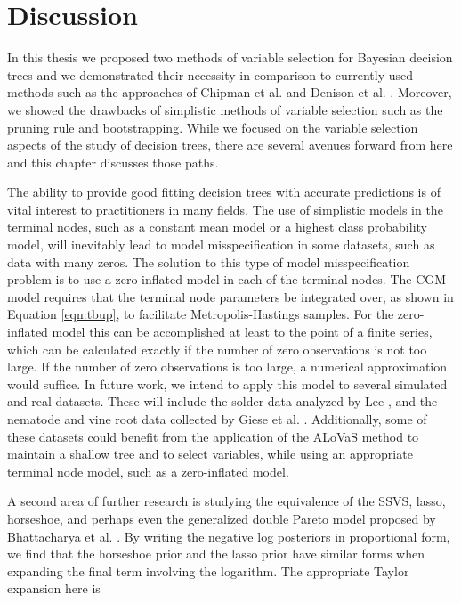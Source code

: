 \chapter{Discussion}
\label{ch:discuss}
 
In this thesis we proposed two methods of variable selection for Bayesian decision trees and we demonstrated their necessity in comparison to currently used methods such as  the approaches of Chipman et al. \cite{chipman1998bayesian} and Denison et al. \cite{denison1998bayesian}. Moreover, we showed the drawbacks of simplistic methods of variable selection such as the pruning rule and bootstrapping. While we focused on the variable selection aspects of the study of decision trees, there are several avenues forward from here and this chapter discusses those paths. 

The ability to provide good fitting decision trees with accurate predictions is of vital interest to practitioners in many fields. The use of simplistic models in the terminal nodes, such as a constant mean model or a highest class probability model, will inevitably lead to model misspecification in some datasets, such as data with many zeros. The solution to this type of model misspecification problem is to use a zero-inflated model in each of the terminal nodes. The CGM model requires  that the terminal node parameters be integrated over, as shown in Equation \ref{eqn:tbup}, to facilitate Metropolis-Hastings samples. For the zero-inflated model this can be accomplished at least to the point of a finite series, which can be calculated exactly if the number of zero observations is not too large. If the number of zero observations is too large, a numerical approximation would suffice. In future work, we intend to apply this model to several simulated and real datasets. These will include the solder data analyzed by Lee \cite{lee2006decision}, and the nematode and vine root data collected by Giese et al. \cite{giese2014,giese2014complete}. Additionally, some of these datasets could benefit from the application of the ALoVaS method to maintain a shallow tree and to select variables, while using an appropriate terminal node model, such as a zero-inflated model.  

A second area of further research is studying the equivalence of the SSVS, lasso, horseshoe, and perhaps even the generalized double Pareto model proposed by Bhattacharya et al. \cite{bhattacharya2012bayesian}. By writing the negative log posteriors in proportional form, we find that the horseshoe prior and the lasso prior have similar forms when expanding the final term involving the logarithm. The appropriate Taylor expansion here is 

